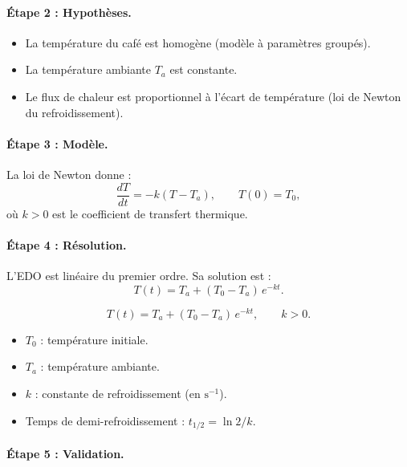 \paragraph{\'Etape 2 : Hypoth\`eses.}
\begin{itemize}
  \item La temp\'erature du caf\'e est homog\`ene (mod\`ele \`a
    param\`etres group\'es).
  \item La temp\'erature ambiante $T_a$ est constante.
  \item Le flux de chaleur est proportionnel \`a l'\'ecart de
    temp\'erature (loi de Newton du refroidissement).
\end{itemize}

\paragraph{\'Etape 3 : Mod\`ele.}
La loi de Newton donne :
\[
  \frac{dT}{dt} = -k(T - T_a), \qquad T(0)=T_0,
\]
o\`u $k>0$ est le coefficient de transfert thermique.

\paragraph{\'Etape 4 : R\'esolution.}
L'EDO est lin\'eaire du premier ordre.  Sa solution est :
\[
  T(t) = T_a + (T_0 - T_a)\,e^{-kt}.
\]

\begin{formules}[title=\textbf{Loi de Newton du refroidissement}]
\[
  T(t) = T_a + (T_0 - T_a)\,e^{-kt}, \qquad k > 0.
\]
\begin{itemize}
  \item $T_0$ : temp\'erature initiale.
  \item $T_a$ : temp\'erature ambiante.
  \item $k$ : constante de refroidissement (en $\text{s}^{-1}$).
  \item Temps de demi-refroidissement : $t_{1/2} = \ln 2 / k$.
\end{itemize}
\end{formules}

\paragraph{\'Etape 5 : Validation.}

